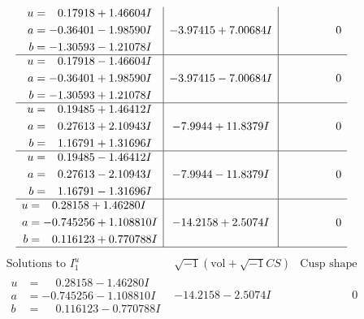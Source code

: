 \documentclass[1p]{elsarticle_modified}
\theoremstyle{definition}
\newcommand{\I}{\sqrt{-1}}
\begin{document}
$$\begin{array}{c|c|c}
\begin{aligned}
u &= \phantom{-}0.17918 + 1.46604 I \\
a &= -0.36401 - 1.98590 I \\
b &= -1.30593 - 1.21078 I\end{aligned}
 & -3.97415 + 7.00684 I & \phantom{-0.000000 } 0 \\ \hline\begin{aligned}
u &= \phantom{-}0.17918 - 1.46604 I \\
a &= -0.36401 + 1.98590 I \\
b &= -1.30593 + 1.21078 I\end{aligned}
 & -3.97415 - 7.00684 I & \phantom{-0.000000 } 0 \\ \hline\begin{aligned}
u &= \phantom{-}0.19485 + 1.46412 I \\
a &= \phantom{-}0.27613 + 2.10943 I \\
b &= \phantom{-}1.16791 + 1.31696 I\end{aligned}
 & -7.9944 + 11.8379 I & \phantom{-0.000000 } 0 \\ \hline\begin{aligned}
u &= \phantom{-}0.19485 - 1.46412 I \\
a &= \phantom{-}0.27613 - 2.10943 I \\
b &= \phantom{-}1.16791 - 1.31696 I\end{aligned}
 & -7.9944 - 11.8379 I & \phantom{-0.000000 } 0 \\ \hline\begin{aligned}
u &= \phantom{-}0.28158 + 1.46280 I \\
a &= -0.745256 + 1.108810 I \\
b &= \phantom{-}0.116123 + 0.770788 I\end{aligned}
 & -14.2158 + 2.5074 I & \phantom{-0.000000 } 0\\
 \hline 
 \end{array}$$\newpage$$\begin{array}{c|c|c}  
\text{Solutions to }I^u_{1}& \I (\text{vol} + \sqrt{-1}CS) & \text{Cusp shape}\\
 \hline 
\begin{aligned}
u &= \phantom{-}0.28158 - 1.46280 I \\
a &= -0.745256 - 1.108810 I \\
b &= \phantom{-}0.116123 - 0.770788 I\end{aligned}
 & -14.2158 - 2.5074 I & \phantom{-0.000000 } 0 \\ \hline\begin{aligned}

\end{aligned}
\end{array}$$
\end{document}
